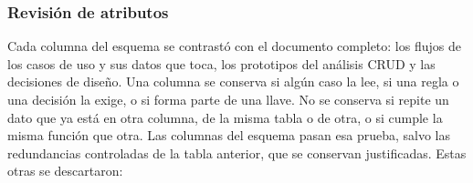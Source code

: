 \subsubsection*{Revisión de atributos}

Cada columna del esquema se contrastó con el documento completo: los flujos de los casos de uso y sus datos que toca, los prototipos del análisis CRUD y las decisiones de diseño. Una columna se conserva si algún caso la lee, si una regla o una decisión la exige, o si forma parte de una llave. No se conserva si repite un dato que ya está en otra columna, de la misma tabla o de otra, o si cumple la misma función que otra. Las \bdNumColumnas{} columnas del esquema pasan esa prueba, salvo las redundancias controladas de la tabla anterior, que se conservan justificadas. Estas otras se descartaron:

